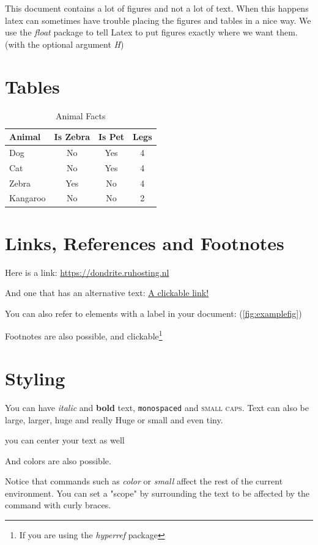 \documentclass[12pt]{scrarticle}
\begin{document}
This document contains a lot of figures and not a lot of text. When this happens latex can sometimes have trouble placing the figures and tables in a nice way. We use the \textit{float} package to tell Latex to put figures exactly where we want them. (with the optional argument \textit{H})

\section{Tables}

\begin{table}[H]
    \centering
    \begin{tabular}{|l||c|c|c|}
    \hline 
    Animal & Is Zebra & Is Pet & Legs\\
    \hline\hline
    Dog         & No    & Yes   & 4\\
    Cat         & No    & Yes   & 4\\
    Zebra       & Yes   & No    & 4\\
    Kangaroo    & No    & No    & 2\\
    \hline
    \end{tabular}
    \caption{Animal Facts}
    \label{tab:my_label}
\end{table}

\section{Links, References and Footnotes}

Here is a link: \url{https://dondrite.ruhosting.nl}

And one that has an alternative text: \href{https://www.youtube.com/watch?v=dQw4w9WgXcQ}{A clickable link!}

You can also refer to elements with a label in your document: (\ref{fig:examplefig})

Footnotes are also possible, and clickable\footnote{If you are using the \textit{hyperref} package}

\section{Styling}

You can have \textit{italic} and \textbf{bold} text, \texttt{monospaced} and \textsc{small caps}. Text can also be {\large{large}}, {\Large{larger}}, {\huge huge} and {\Huge really Huge} or {\small{small}} and even {\tiny tiny}.

\begin{center}
    you can center your text as well
\end{center}

And {\color{blue}colors} {\color{red} are} {\color{cyan} also} possible.

Notice that commands such as \textit{color} or \textit{small} affect the rest of the current environment. You can set a "scope" by surrounding the text to be affected by the command with curly braces.
\end{document}

